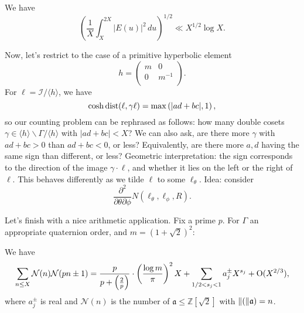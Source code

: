 \documentclass[reqno]{amsart} 
\begin{document}
\begin{theorem}
  We have
  \begin{equation*}
    \left( \frac{1}{X} \int_X^{2 X} \lvert E(u) \rvert^2 \, d u \right)^{1/2} \ll X^{1/2} \log X.
  \end{equation*}
\end{theorem}

Now, let's restrict to the case of a primitive hyperbolic element
\begin{equation*}
  h =
  \begin{pmatrix}
    m    & 0 \\
    0 & m^{-1} \\
  \end{pmatrix}.
\end{equation*}
For $\ell = \mathcal{I} / \langle h \rangle$, we have
\begin{equation*}
  \cosh \operatorname{dist}(\ell, \gamma \ell) = \max \left( \lvert a d + b c \rvert, 1 \right),
\end{equation*}
so our counting problem can be rephrased as follows: how many double cosets $\gamma \in \langle h \rangle \backslash \Gamma / \langle h \rangle$ with $\lvert a d + b c \rvert < X$?  We can also ask, are there more $\gamma$ with $a d + b c > 0$ than $a d + b c < 0$, or less?  Equivalently, are there more $a, d$ having the same sign than different, or less?  Geometric interpretation: the sign corresponds to the direction of the image $\gamma \cdot \ell$, and whether it lies on the left or the right of $\ell$.  This behaves differently as we tilde $\ell$ to some $\ell_\theta$.  Idea: consider
\begin{equation*}
  \frac{\partial^2}{\partial \theta \partial \phi}
  N(\ell_\theta, \ell_\phi, R).
\end{equation*}

Let's finish with a nice arithmetic application.  Fix a prime $p$.  For $\Gamma$ an appropriate quaternion order, and $m = \left( 1 + \sqrt{2} \right)^2$:
\begin{theorem}[V.\ 2023, $p=5$; Hejhal 1982]
  We have
  \begin{equation*}
    \sum_{n \leq X} \mathcal{N}(n) \mathcal{N}(p n \pm 1)
    =
    \frac{p}{p + \left( \frac{2}{p} \right)}
    \cdot \left( \frac{\log m}{ \pi} \right)^2 X +
    \sum_{1/2 < s_j < 1}
    a_j^{\pm} X^{s_j} + \operatorname{O}(X^{2/3}),
  \end{equation*}
  where $a_j^{\pm}$ is real and $\mathcal{N}(n)$ is the number of $\mathfrak{a} \leq \mathbb{Z}[\sqrt{2}]$ with $\lVert(\rVert\mathfrak{a}) = n$.
\end{theorem}
\end{document}
